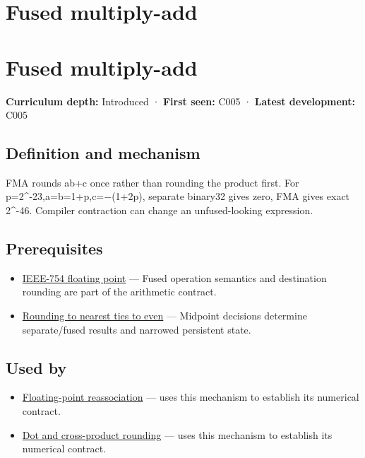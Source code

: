 \hypertarget{appendix-41e8ef22a21e}{}
\section*{Fused multiply-add}
\section{Fused multiply-add}\label{appendix-41e8ef22a21e-fused-multiply-add}

\textbf{Curriculum depth:} Introduced · \textbf{First seen:} C005 · \textbf{Latest development:} C005

\subsection{Definition and mechanism}\label{appendix-41e8ef22a21e-definition-and-mechanism}

FMA rounds ab+c once rather than rounding the product first. For p=2\^{}-23,a=b=1+p,c=−(1+2p), separate binary32 gives zero, FMA gives exact 2\^{}-46. Compiler contraction can change an unfused-looking expression.

\subsection{Prerequisites}\label{appendix-41e8ef22a21e-prerequisites}

\begin{itemize}
\tightlist
\item
  \hyperref[appendix-343615f49ddf]{IEEE-754 floating point} --- Fused operation semantics and destination rounding are part of the arithmetic contract.
\item
  \hyperref[appendix-614afe1de592]{Rounding to nearest ties to even} --- Midpoint decisions determine separate/fused results and narrowed persistent state.
\end{itemize}

\subsection{Used by}\label{appendix-41e8ef22a21e-used-by}

\begin{itemize}
\tightlist
\item
  \hyperref[appendix-c2ac4a84c283]{Floating-point reassociation} --- uses this mechanism to establish its numerical contract.
\item
  \hyperref[appendix-5aef4f13483a]{Dot and cross-product rounding} --- uses this mechanism to establish its numerical contract.
\end{itemize}

